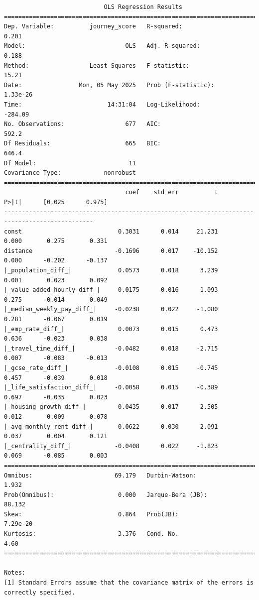 \documentclass[
  number]{elsarticle}
\begin{document}
\begin{verbatim}
                            OLS Regression Results                            
==============================================================================
Dep. Variable:          journey_score   R-squared:                       0.201
Model:                            OLS   Adj. R-squared:                  0.188
Method:                 Least Squares   F-statistic:                     15.21
Date:                Mon, 05 May 2025   Prob (F-statistic):           1.33e-26
Time:                        14:31:04   Log-Likelihood:                -284.09
No. Observations:                 677   AIC:                             592.2
Df Residuals:                     665   BIC:                             646.4
Df Model:                          11                                         
Covariance Type:            nonrobust                                         
===============================================================================================
                                  coef    std err          t      P>|t|      [0.025      0.975]
-----------------------------------------------------------------------------------------------
const                           0.3031      0.014     21.231      0.000       0.275       0.331
distance                       -0.1696      0.017    -10.152      0.000      -0.202      -0.137
|_population_diff_|             0.0573      0.018      3.239      0.001       0.023       0.092
|_value_added_hourly_diff_|     0.0175      0.016      1.093      0.275      -0.014       0.049
|_median_weekly_pay_diff_|     -0.0238      0.022     -1.080      0.281      -0.067       0.019
|_emp_rate_diff_|               0.0073      0.015      0.473      0.636      -0.023       0.038
|_travel_time_diff_|           -0.0482      0.018     -2.715      0.007      -0.083      -0.013
|_gcse_rate_diff_|             -0.0108      0.015     -0.745      0.457      -0.039       0.018
|_life_satisfaction_diff_|     -0.0058      0.015     -0.389      0.697      -0.035       0.023
|_housing_growth_diff_|         0.0435      0.017      2.505      0.012       0.009       0.078
|_avg_monthly_rent_diff_|       0.0622      0.030      2.091      0.037       0.004       0.121
|_centrality_diff_|            -0.0408      0.022     -1.823      0.069      -0.085       0.003
==============================================================================
Omnibus:                       69.179   Durbin-Watson:                   1.932
Prob(Omnibus):                  0.000   Jarque-Bera (JB):               88.132
Skew:                           0.864   Prob(JB):                     7.29e-20
Kurtosis:                       3.376   Cond. No.                         4.60
==============================================================================

Notes:
[1] Standard Errors assume that the covariance matrix of the errors is correctly specified.
\end{verbatim}
\end{document}
